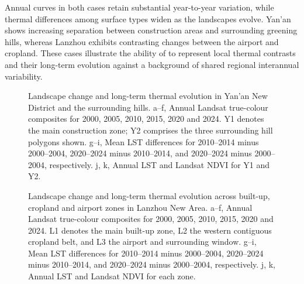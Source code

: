 Annual curves in both cases retain substantial year-to-year variation, while thermal differences among surface types widen as the landscapes evolve. Yan'an shows increasing separation between construction areas and surrounding greening hills, whereas Lanzhou exhibits contrasting changes between the airport and cropland. These cases illustrate the ability of \chinatherm{} to represent local thermal contrasts and their long-term evolution against a background of shared regional interannual variability.

\begin{figure}[p]
\centering
{}
\ReviewFloatBegin
\caption{Landscape change and long-term thermal evolution in Yan'an New District and the surrounding hills. a--f, Annual Landsat true-colour composites for 2000, 2005, 2010, 2015, 2020 and 2024. Y1 denotes the main construction zone; Y2 comprises the three surrounding hill polygons shown. g--i, Mean LST differences for 2010--2014 minus 2000--2004, 2020--2024 minus 2010--2014, and 2020--2024 minus 2000--2004, respectively. j, k, Annual \chinatherm{} LST and Landsat NDVI for Y1 and Y2.}
\label{fig:yanan-long-term}
\ReviewFloatEnd
\end{figure}

\begin{figure}[p]
\centering
{}
\ReviewFloatBegin
\caption{Landscape change and long-term thermal evolution across built-up, cropland and airport zones in Lanzhou New Area. a--f, Annual Landsat true-colour composites for 2000, 2005, 2010, 2015, 2020 and 2024. L1 denotes the main built-up zone, L2 the western contiguous cropland belt, and L3 the airport and surrounding window. g--i, Mean LST differences for 2010--2014 minus 2000--2004, 2020--2024 minus 2010--2014, and 2020--2024 minus 2000--2004, respectively. j, k, Annual \chinatherm{} LST and Landsat NDVI for each zone.}
\label{fig:lanzhou-long-term}
\ReviewFloatEnd
\end{figure}
\clearpage
